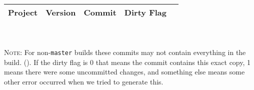 \documentclass[manual.tex]{subfiles}
\begin{document}
\begin{tabular}{ | l | l | l | l | l | }
\hline
Project & Version & Commit & Dirty Flag \\
\hline
\hline


\end{tabular}
\\
\\
\textsc{Note:} For non-\texttt{master} builds these commits may not contain everything in the build. (). If the dirty flag is 0 that means the commit contains this exact copy, 1 means there were some uncommitted changes, and something else means some other error occurred when we tried to generate this.
\end{document}
